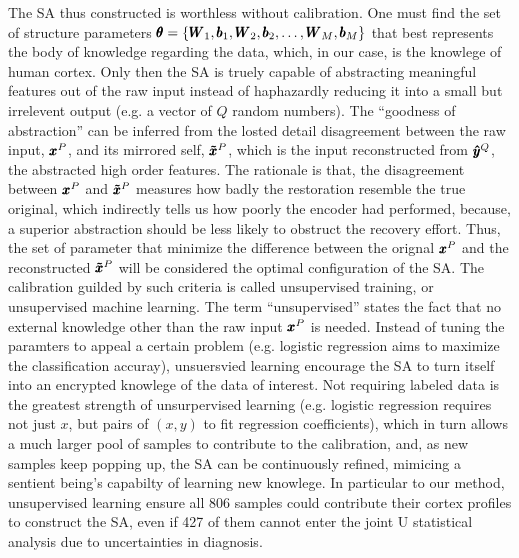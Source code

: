 {The SA thus constructed is worthless without calibration. One must find the set of structure parameters $\pmb{\theta}=\{\pmb{W}_1, \pmb{b}_1, \pmb{W}_2, \pmb{b}_2, \dots, \pmb{W}_M, \pmb{b}_M\}$ that best represents the body of knowledge regarding the data, which, in our case, is the knowlege of human cortex. Only then the SA is truely capable of abstracting meaningful features out of the raw input instead of haphazardly reducing it into a small but irrelevent output (e.g. a vector of $Q$ random numbers). The ``goodness of abstraction'' can be inferred from the losted detail disagreement between the raw input, $\pmb{x}^P$, and its mirrored self, $\pmb{\tilde{x}}^P$, which is the input reconstructed from $\pmb{\hat{y}}^Q$, the abstracted high order features. The rationale is that, the disagreement between $\pmb{x}^P$ and $\pmb{\tilde{x}}^P$ measures how badly the restoration resemble the true original, which indirectly tells us how poorly the encoder had performed, because, a superior abstraction should be less likely to obstruct the recovery effort. Thus, the set of parameter that minimize the difference between the orignal $\pmb{x}^P$ and the reconstructed $\pmb{\tilde{x}}^P$ will be considered the optimal configuration of the SA. The calibration guilded by such criteria is called unsupervised training, or unsupervised machine learning. The term ``unsupervised'' states the fact that no external knowledge other than the raw input $\pmb{x}^P$ is needed. Instead of tuning the paramters to appeal a certain problem (e.g. logistic regression aims to maximize the classification accuray), unsuersvied learning encourage the SA to turn itself into an encrypted knowlege of the data of interest. Not requiring labeled data is the greatest strength of unsurpervised learning (e.g. logistic regression requires not just $x$, but pairs of $(x,y)$ to fit regression coefficients), which in turn allows a much larger pool of samples to contribute to the calibration, and, as new samples keep popping up, the SA can be continuously refined, mimicing a sentient being's capabilty of learning new knowlege. In particular to our method, unsupervised learning ensure all 806 samples could contribute their cortex profiles to construct the SA, even if 427 of them cannot enter the joint U statistical analysis due to uncertainties in diagnosis.

}
